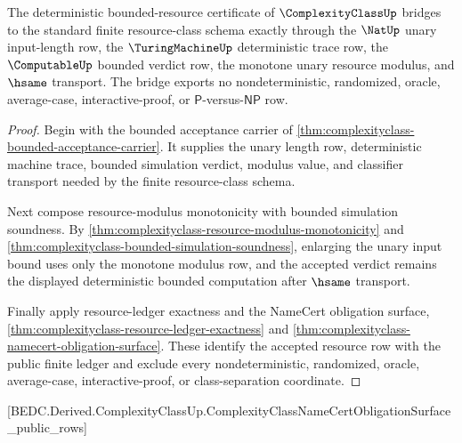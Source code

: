 \begin{theorem}
\label{thm:complexityclass-deterministic-resource-bridge}
The deterministic bounded-resource certificate of $\ComplexityClassUp$ bridges to the standard finite resource-class schema exactly through the $\NatUp$ unary input-length row, the $\TuringMachineUp$ deterministic trace row, the $\ComputableUp$ bounded verdict row, the monotone unary resource modulus, and $\hsame$ transport. The bridge exports no nondeterministic, randomized, oracle, average-case, interactive-proof, or $\mathsf{P}$-versus-$\mathsf{NP}$ row.
\end{theorem}
\begin{proof}
Begin with the bounded acceptance carrier of \autoref{thm:complexityclass-bounded-acceptance-carrier}. It supplies the unary length row, deterministic machine trace, bounded simulation verdict, modulus value, and classifier transport needed by the finite resource-class schema.

Next compose resource-modulus monotonicity with bounded simulation soundness. By \autoref{thm:complexityclass-resource-modulus-monotonicity} and \autoref{thm:complexityclass-bounded-simulation-soundness}, enlarging the unary input bound uses only the monotone modulus row, and the accepted verdict remains the displayed deterministic bounded computation after $\hsame$ transport.

Finally apply resource-ledger exactness and the NameCert obligation surface, \autoref{thm:complexityclass-resource-ledger-exactness} and \autoref{thm:complexityclass-namecert-obligation-surface}. These identify the accepted resource row with the public finite ledger and exclude every nondeterministic, randomized, oracle, average-case, interactive-proof, or class-separation coordinate.
\end{proof}

[BEDC.Derived.ComplexityClassUp.ComplexityClassNameCertObligationSurface\_public\_rows]

